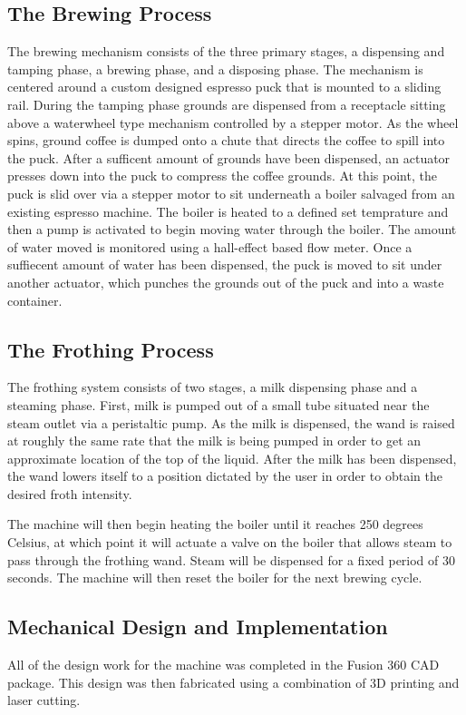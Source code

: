 \documentclass[conference]{IEEEtran}
\begin{document}
\subsection{The Brewing Process}
The brewing mechanism consists of the three primary stages, a dispensing and
tamping phase, a brewing phase, and a disposing phase. The mechanism is
centered around a custom designed espresso puck that is mounted to a
sliding rail. During the tamping phase grounds are dispensed from a receptacle
sitting above a waterwheel type mechanism controlled by a stepper motor. As the
wheel spins, ground coffee is dumped onto a chute that directs the coffee to
spill into the puck. After a sufficent amount of grounds have been dispensed, an
actuator presses down into the puck to compress the coffee grounds. At this
point, the puck is slid over via a stepper motor to sit underneath a boiler
salvaged from an existing espresso machine. The boiler is heated to a defined
set temprature and then a pump is activated to begin moving water through the
boiler. The amount of water moved is monitored using a hall-effect based flow
meter. Once a suffiecent amount of water has been dispensed, the puck is moved
to sit under another actuator, which punches the grounds out of the puck and
into a waste container.

\subsection{The Frothing Process}
The frothing system consists of two stages, a milk dispensing phase and a steaming phase.
First, milk is pumped out of a small tube situated near the steam outlet via a peristaltic pump. 
As the milk is dispensed, the wand is raised at roughly the same rate that the milk is being pumped
in order to get an approximate location of the top of the liquid. After the milk has been dispensed, the 
wand lowers itself to a position dictated by the user in order to obtain the desired froth intensity.

The machine will then begin heating the boiler until it reaches 250 degrees Celsius, at which point it will
actuate a valve on the boiler that allows steam to pass through the frothing wand. Steam will be dispensed
for a fixed period of 30 seconds. The machine will then reset the boiler for the next brewing cycle.

\subsection{Mechanical Design and Implementation}
All of the design work for the machine was completed in the Fusion 360 CAD
package. This design was then fabricated using a combination of 3D printing and
laser cutting. 
\end{document}
